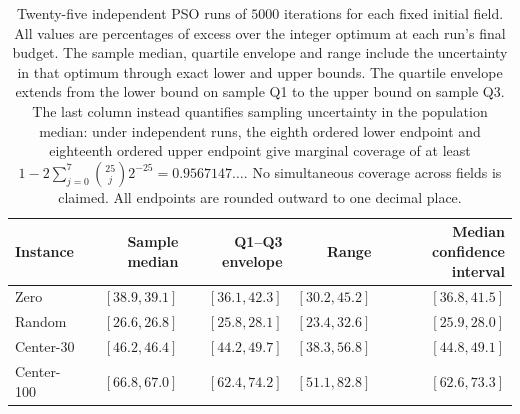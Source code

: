 \begin{table}[!tbp]\centering\footnotesize\setlength{\tabcolsep}{4pt}
\caption{Twenty-five independent PSO runs of $5000$ iterations for each fixed
initial field. All values are percentages of excess over the integer optimum
at each run's final budget. The sample median, quartile envelope and range
include the uncertainty in that optimum through exact lower and upper bounds.
The quartile envelope extends from the lower bound on sample Q1 to the upper
bound on sample Q3. The last column instead quantifies sampling uncertainty
in the population median: under independent runs, the eighth ordered lower
endpoint and eighteenth ordered upper endpoint give marginal coverage of at
least $1-2\sum_{j=0}^{7}\binom{25}{j}2^{-25}=0.9567147\ldots$.
No simultaneous coverage across fields is claimed. All endpoints are rounded
outward to one decimal place.}
\label{tab:pso-long25-si}
\begin{tabular}{lrrrr}
\toprule
Instance & Sample median & Q1--Q3 envelope & Range & Median confidence interval\\
\midrule
Zero & $[38.9, 39.1]$ & $[36.1, 42.3]$ & $[30.2, 45.2]$ & $[36.8, 41.5]$\\
Random & $[26.6, 26.8]$ & $[25.8, 28.1]$ & $[23.4, 32.6]$ & $[25.9, 28.0]$\\
Center-30 & $[46.2, 46.4]$ & $[44.2, 49.7]$ & $[38.3, 56.8]$ & $[44.8, 49.1]$\\
Center-100 & $[66.8, 67.0]$ & $[62.4, 74.2]$ & $[51.1, 82.8]$ & $[62.6, 73.3]$\\
\bottomrule
\end{tabular}
\end{table}
